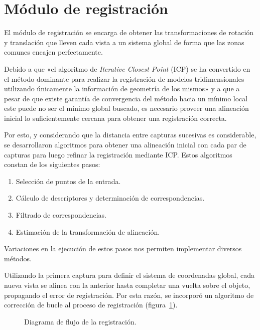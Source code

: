 \section{Módulo de registración}
	El módulo de registración se encarga de obtener las transformaciones de rotación y translación
	que lleven cada vista a un sistema global de forma
	que las zonas comunes encajen perfectamente.

	Debido a que
	«el algoritmo de \emph{Iterative Closest Point} (ICP) se ha convertido en el
	método dominante para realizar la registración de modelos tridimensionales
	utilizando únicamente la información de geometría de los mismos\cite{Rusinkiewicz02real-time3d}»
	y a que a pesar de que existe garantía de convergencia del método
	hacia un mínimo local este puede no ser el mínimo global buscado,
	es necesario proveer una alineación inicial
	lo suficientemente cercana para obtener una registración correcta\cite{regBesl92}.

	Por esto, y considerando que la distancia entre capturas sucesivas es considerable,
	se desarrollaron algoritmos para obtener una alineación inicial
	con cada par de capturas para luego refinar la registración mediante ICP.
	Estos algoritmos constan de los siguientes pasos:
	\begin{enumerate}
		\item Selección de puntos de la entrada.
		\item Cálculo de descriptores y determinación de correspondencias.
		\item Filtrado de correspondencias.
		\item Estimación de la transformación de alineación.
	\end{enumerate}
	Variaciones en la ejecución de estos pasos nos permiten implementar diversos métodos.


	Utilizando la primera captura para definir el sistema de coordenadas
	global, cada nueva vista se alinea con la anterior hasta completar una
	vuelta sobre el objeto, propagando el error de registración.
	Por esta razón, se incorporó un algoritmo de corrección de bucle al proceso de registración
	(figura~\ref{fig:flow_registracion}).


	\begin{figure}
		\caption[Diagrama de flujo de la registración]{\label{fig:flow_registracion}Diagrama de flujo de la registración.}
	\end{figure}


